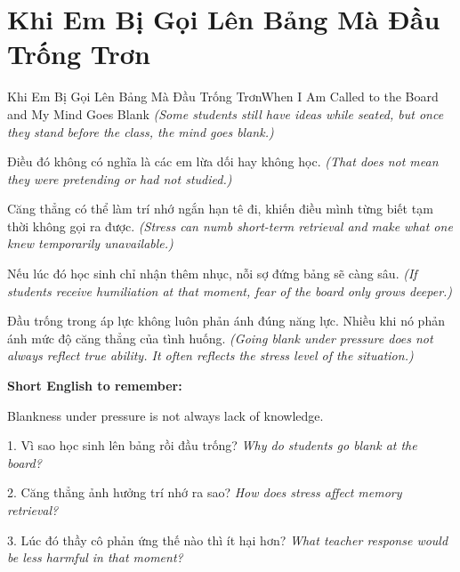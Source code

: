 \section{Khi Em Bị Gọi Lên Bảng Mà Đầu Trống Trơn}
\begin{truyen}{Khi Em Bị Gọi Lên Bảng Mà Đầu Trống Trơn}{When I Am Called to the Board and My Mind Goes Blank}
\textit{(Some students still have ideas while seated, but once they stand before the class, the mind goes blank.)}

Điều đó không có nghĩa là các em lừa dối hay không học.
\textit{(That does not mean they were pretending or had not studied.)}

Căng thẳng có thể làm trí nhớ ngắn hạn tê đi, khiến điều mình từng biết tạm thời không gọi ra được.
\textit{(Stress can numb short-term retrieval and make what one knew temporarily unavailable.)}

Nếu lúc đó học sinh chỉ nhận thêm nhục, nỗi sợ đứng bảng sẽ càng sâu.
\textit{(If students receive humiliation at that moment, fear of the board only grows deeper.)}
\end{truyen}

\begin{baihoc}
Đầu trống trong áp lực không luôn phản ánh đúng năng lực. Nhiều khi nó phản ánh mức độ căng thẳng của tình huống.
\textit{(Going blank under pressure does not always reflect true ability. It often reflects the stress level of the situation.)}
\end{baihoc}

\begin{ghinhoanh}
\textbf{Short English to remember:}

Blankness under pressure is not always lack of knowledge.

\end{ghinhoanh}

\begin{tuhocnhanh}
1. Vì sao học sinh lên bảng rồi đầu trống? \textit{Why do students go blank at the board?}

2. Căng thẳng ảnh hưởng trí nhớ ra sao? \textit{How does stress affect memory retrieval?}

3. Lúc đó thầy cô phản ứng thế nào thì ít hại hơn? \textit{What teacher response would be less harmful in that moment?}
\end{tuhocnhanh}
\ngancach

